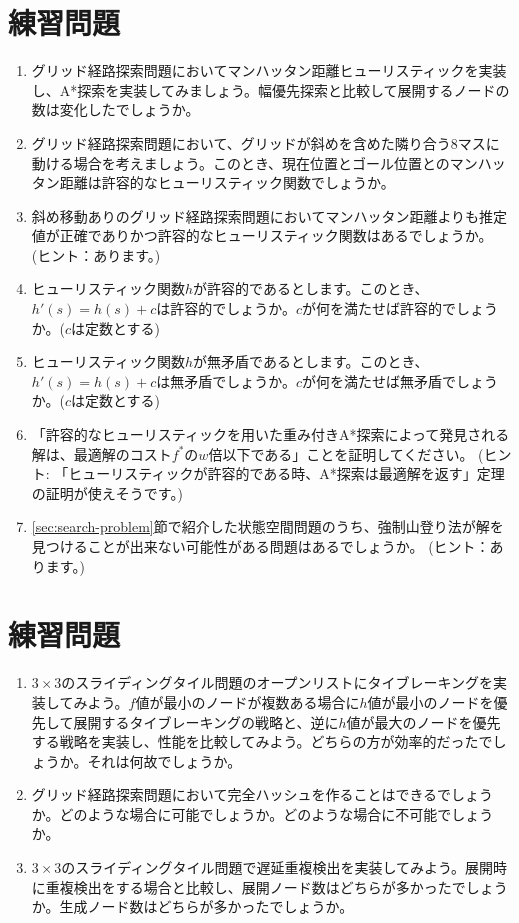 \section{練習問題}

\begin{enumerate}
  \item グリッド経路探索問題においてマンハッタン距離ヒューリスティックを実装し、A*探索を実装してみましょう。幅優先探索と比較して展開するノードの数は変化したでしょうか。

  \item グリッド経路探索問題において、グリッドが斜めを含めた隣り合う8マスに動ける場合を考えましょう。このとき、現在位置とゴール位置とのマンハッタン距離は許容的なヒューリスティック関数でしょうか。
  
  \item 斜め移動ありのグリッド経路探索問題においてマンハッタン距離よりも推定値が正確でありかつ許容的なヒューリスティック関数はあるでしょうか。
  (ヒント：あります。)
  
  \item ヒューリスティック関数$h$が許容的であるとします。このとき、$h'(s) = h(s) + c$は許容的でしょうか。$c$が何を満たせば許容的でしょうか。($c$は定数とする)
  \item ヒューリスティック関数$h$が無矛盾であるとします。このとき、$h'(s) = h(s) + c$は無矛盾でしょうか。$c$が何を満たせば無矛盾でしょうか。($c$は定数とする)
  
  \item 「許容的なヒューリスティックを用いた重み付きA*探索によって発見される解は、最適解のコスト$f^*$の$w$倍以下である」ことを証明してください。
  (ヒント: 「ヒューリスティックが許容的である時、A*探索は最適解を返す」定理の証明が使えそうです。)
  
  \item \ref{sec:search-problem}節で紹介した状態空間問題のうち、強制山登り法が解を見つけることが出来ない可能性がある問題はあるでしょうか。
  (ヒント：あります。)
\end{enumerate}


\section{練習問題}
\begin{enumerate}
	\item $3 \times 3$のスライディングタイル問題のオープンリストにタイブレーキングを実装してみよう。$f$値が最小のノードが複数ある場合に$h$値が最小のノードを優先して展開するタイブレーキングの戦略と、逆に$h$値が最大のノードを優先する戦略を実装し、性能を比較してみよう。どちらの方が効率的だったでしょうか。それは何故でしょうか。
	
	\item グリッド経路探索問題において完全ハッシュを作ることはできるでしょうか。どのような場合に可能でしょうか。どのような場合に不可能でしょうか。

	\item $3 \times 3$のスライディングタイル問題で遅延重複検出を実装してみよう。展開時に重複検出をする場合と比較し、展開ノード数はどちらが多かったでしょうか。生成ノード数はどちらが多かったでしょうか。
\end{enumerate}


